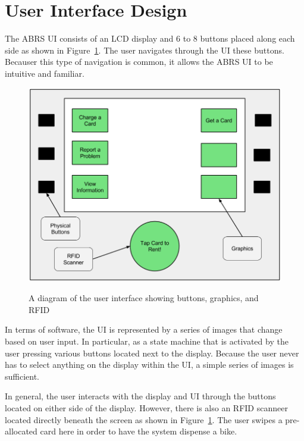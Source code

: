 \documentclass[11pt,a4paper,onesides]{report}
\begin{document}
\section{User Interface Design}

    The ABRS UI consists of an LCD display and 6 to 8 buttons placed along each side as shown in Figure~\ref{fig:user-interface}.  The user navigates through the UI these buttons.  Becauser this type of navigation is common, it allows the ABRS UI to be intuitive and familiar.    

\begin{figure}[h]
	\centering
		\includegraphics[scale = 0.5]{user-interface}
	\label{fig:user-interface}
\caption{A diagram of the user interface showing buttons, graphics, and RFID}

\end{figure}

In terms of software, the UI is represented by a series of images that change based on user input.  In particular, as a state machine that is activated by the user pressing various buttons located next to the display.  Because the user never has to select anything on the display within the UI, a simple series of images is sufficient.

In general, the user interacts with the display and UI through the buttons located on either side of the display.  However, there is also an RFID scanneer located directly beneath the screen as shown in Figure~\ref{fig:user-interface}.  The user swipes a pre-allocated card here in order to have the system dispense a bike.  
\end{document}
